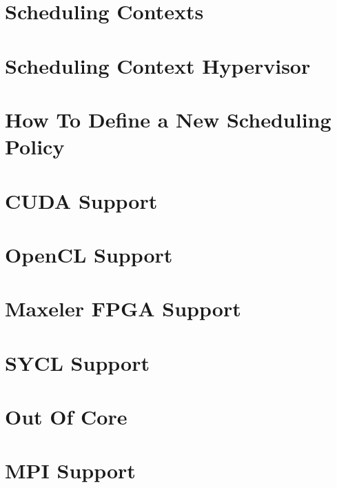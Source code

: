 \chapter{Scheduling Contexts}
\label{SchedulingContexts}
\hypertarget{SchedulingContexts}{}


\chapter{Scheduling Context Hypervisor}
\label{SchedulingContextHypervisor}
\hypertarget{SchedulingContextHypervisor}{}


\chapter{How To Define a New Scheduling Policy}
\label{HowToDefineANewSchedulingPolicy}
\hypertarget{HowToDefineANewSchedulingPolicy}{}


\chapter{CUDA Support}
\label{CUDASupport}
\hypertarget{CUDASupport}{}


\chapter{OpenCL Support}
\label{OpenCLSupport}
\hypertarget{OpenCLSupport}{}


\chapter{Maxeler FPGA Support}
\label{MaxFPGASupport}
\hypertarget{MaxFPGASupport}{}


\chapter{SYCL Support}
\label{SYCLSupport}
\hypertarget{SYCLSupport}{}


\chapter{Out Of Core}
\label{OutOfCore}
\hypertarget{OutOfCore}{}


\chapter{MPI Support}
\label{MPISupport}
\hypertarget{MPISupport}{}


